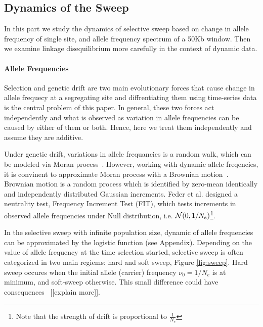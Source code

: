 \documentclass[11pt]{article}
\begin{document}
\subsection{Dynamics of the Sweep}
In this part we study the dynamics of selective sweep based on change in allele
 frequency of single site, and allele frequency spectrum of a 50Kb window. 
 Then we examine linkage disequilibrium more carefully in the context of dynamic data.
\paragraph{Allele Frequencies}
Selection and genetic drift are two main evolutionary forces that cause change in 
allele frequecy at a segregating site and diffrentiating them using time-series data 
is the central problem of this paper. In general, these two forces act 
independently and what is observed as variation in allele frequencies can be 
caused by either of them or both. Hence, here we treat them independently and 
assume they are additive.

Under genetic drift, variations in allele frequancies is a random 
walk, which can be modeled via Moran process~\cite{moran1962statistical}.
However, working with dynamic allele freqencies, it is convinent to approximate 
Moran process with a Brownian motion~\cite{Ewens2012Mathematical}. 
Brownian motion is a random process which is identified by zero-mean identically 
and independently  distributed Gaussian increments. Feder et al. 
\cite{feder2014Identifying} designed a neutrality test, Frequency Increment Test 
(FIT), which tests increments in observed allele frequencies under Null 
distribution, i.e. ${\cal N}(0,1/N_e)$\footnote{Note that the strength of drift is 
proportional to $\frac{1}{N_e}$}.

In the selective sweep with infinite population size, dynamic of allele frequencies 
can be approximated by the logistic function (see Appendix). Depending on the 
value of allele frequency at the time selection started, selective sweep is often 
categorized in two main regiems: hard and soft sweep, Figure \ref{fig:sweep}. 
Hard sweep occures when the initial allele (carrier) frequency $\nu_0=1/N_e$ is at 
minimum, and soft-sweep otherwise. This small difference could have 
consequences~\cite{schrider2015soft} [[explain more]].
\end{document}
